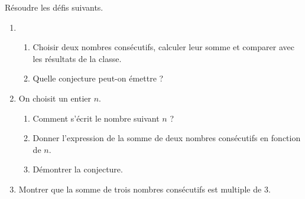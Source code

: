 \begin{Maquette}[Fiche,CorrigeFin,Colonnes=2]{}
\begin{multicols}{2}
      
      \begin{exercice}[Dur] %
         Résoudre les défis suivants.
         \begin{enumerate}
            \item
               \begin{enumerate}
                  \item Choisir deux nombres consécutifs, calculer leur somme et comparer avec les résultats de la classe.
                  \item Quelle conjecture peut-on émettre ?
               \end{enumerate}
            \item On choisit un entier $n$.
               \begin{enumerate}
                  \item Comment s'écrit le nombre suivant $n$ ?
                  \item Donner l'expression de la somme de deux nombres consécutifs en fonction de $n$.
                  \item Démontrer la conjecture.
               \end{enumerate}
            \item Montrer que la somme de trois nombres consécutifs est multiple de 3.
         \end{enumerate}
      \end{exercice}
      

\end{multicols}
\end{Maquette}
